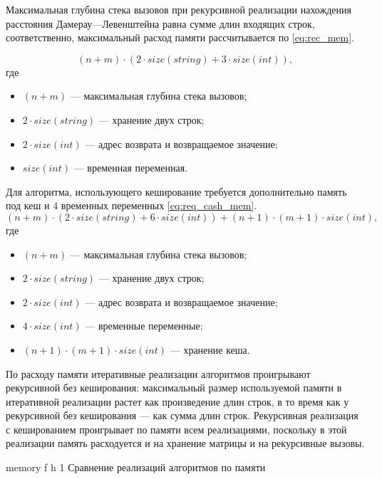 Максимальная глубина стека вызовов при рекурсивной реализации нахождения расстояния Дамерау---Левенштейна равна сумме длин входящих строк, соответственно, максимальный расход памяти рассчитывается по \eqref{eq:rec_mem}.

\begin{equation}
	\label{eq:rec_mem}
	(n + m) \cdot (2 \cdot size(string) + 3 \cdot size(int)),
\end{equation}
где 
\begin{itemize}
	\item $ (n + m) $ --- максимальная глубина стека вызовов;
	\item $ 2 \cdot size(string) $ --- хранение двух строк;
	\item $ 2 \cdot size(int) $ --- адрес возврата и возвращаемое значение;
	\item $ size(int) $ --- временная переменная.
\end{itemize}

Для алгоритма, использующего кеширование требуется дополнительно память под кеш и 4 временных переменных \eqref{eq:req_cash_mem}.
\begin{equation}
	\label{eq:req_cash_mem}
	(n + m) \cdot (2 \cdot size(string) + 6 \cdot size(int)) + (n + 1) \cdot (m + 1) \cdot size(int),
\end{equation}
где 
\begin{itemize}
	\item $ (n + m) $ --- максимальная глубина стека вызовов;
	\item $ 2 \cdot size(string) $ --- хранение двух строк;
	\item $ 2 \cdot size(int) $ --- адрес возврата и возвращаемое значение;
	\item $ 4 \cdot size(int) $ --- временные переменные;
	\item $ (n + 1) \cdot (m + 1) \cdot size(int) $ --- хранение кеша.
\end{itemize}

По расходу памяти итеративные реализации алгоритмов проигрывают рекурсивной без кеширования: максимальный размер используемой памяти в итеративной реализации растет как произведение длин строк, в то время как у рекурсивной без кеширования --- как сумма длин строк. Рекурсивная реализация с кешированием проигрывает по памяти всем реализациями, поскольку в этой реализации память расходуется и на хранение матрицы и на рекурсивные вызовы.

{memory} %
{f} %
{h} %
{1\textwidth} %
{Сравнение реализаций алгоритмов по памяти} %

